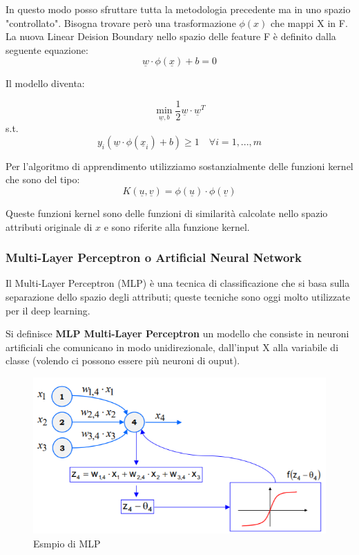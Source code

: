 In questo modo posso sfruttare tutta la metodologia precedente ma in uno spazio "controllato". Bisogna trovare però una trasformazione $\phi(x)$ che mappi X in F.
La nuova Linear Deision Boundary nello spazio delle feature F è definito dalla seguente equazione: 
\[\underline{w} \cdot \phi(\underline{x}) + b = 0\]

Il modello diventa:

\[ \min_{\underline{w},b} \frac{1}{2}\underline{w} \cdot \underline{w}^T \]
\qquad s.t.
\[ y_i (\underline{w} \cdot \phi(\underline{x}_i) + b) \ge 1 \quad \forall i = 1, ..., m\]

Per l'algoritmo di apprendimento utilizziamo sostanzialmente delle funzioni kernel che sono del tipo:
 \[K(\underline{u}, \underline{v}) = \phi(\underline{u}) \cdot \phi(\underline{v})\]
 
 Queste funzioni kernel sono delle funzioni di similarità calcolate nello spazio attributi originale di $x$ e sono riferite alla funzione kernel.

\subsubsection{Multi-Layer Perceptron o Artificial Neural Network}
Il Multi-Layer Perceptron (MLP) è una tecnica di classificazione che si basa sulla separazione dello spazio degli attributi; queste tecniche sono oggi molto utilizzate per il deep learning.
\begin{defn}
 	Si definisce \textbf{MLP Multi-Layer Perceptron} un modello che consiste in neuroni artificiali che comunicano in modo unidirezionale, dall'input X alla variabile di classe (volendo ci possono essere più neuroni di ouput).
\end{defn}

\begin{figure}[H]
	\centering
	\includegraphics[width=0.8 \linewidth]{classification/pict/mlp.png}
	\caption{Esmpio di MLP}
\end{figure}

